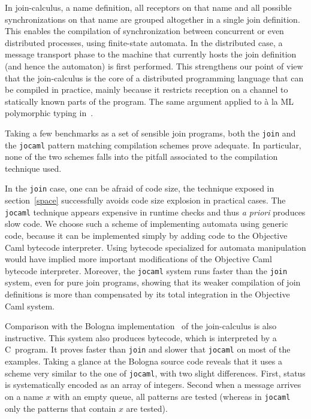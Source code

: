 In join-calculus, a name definition, all receptors on that name and all
possible synchronizations on that name are grouped altogether in a single
join definition. This enables the compilation of synchronization
between concurrent or even distributed processes, using finite-state
automata.
In the distributed case, a message transport phase to the
machine that currently hosts the join definition (and hence the
automaton) is first performed.  This strengthens our point of view
that the join-calculus is the core of a distributed programming
language that can be compiled in practice, mainly because it restricts
reception on a channel to statically known parts of the program.  The
same argument applied to \`a la ML polymorphic typing
in~\cite{join-typing-97}.


Taking a few benchmarks as a set of sensible join programs, both the
{\tt join} and the {\tt jocaml} pattern matching compilation schemes
prove adequate.  In particular, none of the two schemes falls into the
pitfall associated to the compilation technique used.

In the {\tt join} case, one can be afraid of code size, the technique
exposed in section~\ref{space} successfully avoids code size explosion
in practical cases.  The {\tt jocaml} technique appears expensive in
runtime checks and thus {\em a priori} produces slow code.  We choose
such a scheme of implementing automata using generic code, because it
can be implemented simply by adding code to the Objective Caml
bytecode interpreter.  Using bytecode specialized for automata
manipulation would have implied more important modifications of the
Objective Caml bytecode interpreter. Moreover, the {\tt jocaml} system
runs faster than the {\tt join} system, even for pure join programs,
showing that its weaker compilation of join definitions is more than
compensated by its total integration in the Objective Caml system.

Comparison with the Bologna implementation~\cite{Bologna} of the
join-calculus is also instructive.  This system also produces
bytecode, which is interpreted by a C~program.  It proves faster than
{\tt join} and slower that {\tt jocaml} on most of the examples.
Taking a glance at the Bologna source code reveals that it uses a
scheme very similar to the one of {\tt jocaml}, with two slight
differences.  First, status is systematically encoded as an array of
integers.  Second when a message arrives on a name $x$ with an empty
queue, all patterns are tested (whereas in {\tt jocaml} only the
patterns that contain $x$ are tested).

